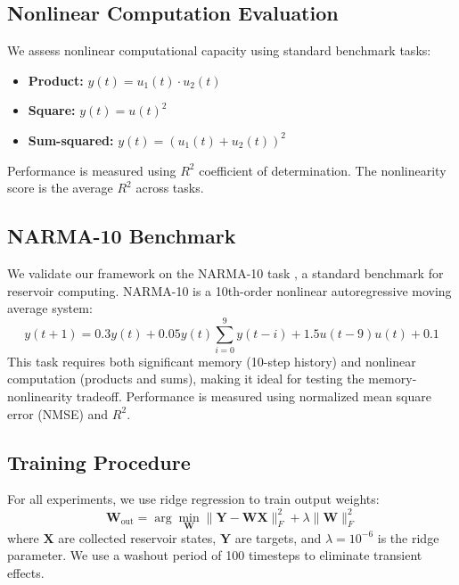 \documentclass{article}
\begin{document}
\subsection{Nonlinear Computation Evaluation}

We assess nonlinear computational capacity using standard benchmark tasks:

\begin{itemize}
    \item \textbf{Product:} $y(t) = u_1(t) \cdot u_2(t)$
    \item \textbf{Square:} $y(t) = u(t)^2$
    \item \textbf{Sum-squared:} $y(t) = (u_1(t) + u_2(t))^2$
\end{itemize}

Performance is measured using $R^2$ coefficient of determination. The nonlinearity score is the average $R^2$ across tasks.

\subsection{NARMA-10 Benchmark}

We validate our framework on the NARMA-10 task \citep{atiya2000}, a standard benchmark for reservoir computing. NARMA-10 is a 10th-order nonlinear autoregressive moving average system:
\begin{equation}
y(t+1) = 0.3 y(t) + 0.05 y(t) \sum_{i=0}^{9} y(t-i) + 1.5 u(t-9) u(t) + 0.1
\end{equation}
This task requires both significant memory (10-step history) and nonlinear computation (products and sums), making it ideal for testing the memory-nonlinearity tradeoff. Performance is measured using normalized mean square error (NMSE) and $R^2$.

\subsection{Training Procedure}

For all experiments, we use ridge regression to train output weights:
\begin{equation}
\mathbf{W}_{\text{out}} = \arg\min_{\mathbf{W}} \|\mathbf{Y} - \mathbf{W}\mathbf{X}\|_F^2 + \lambda\|\mathbf{W}\|_F^2
\end{equation}
where $\mathbf{X}$ are collected reservoir states, $\mathbf{Y}$ are targets, and $\lambda = 10^{-6}$ is the ridge parameter. We use a washout period of 100 timesteps to eliminate transient effects.
\end{document}
